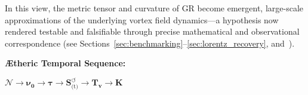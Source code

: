 In this view, the metric tensor and curvature of GR become emergent, large-scale approximations of the underlying vortex field dynamics—a hypothesis now rendered testable and falsifiable through precise mathematical and observational correspondence (see Sections~\ref{sec:benchmarking}–\ref{sec:lorentz_recovery}, and~\cite{VAM-8}).

\vspace{0.8em}

\noindent\textbf{Ætheric Temporal Sequence:}
\begin{center}
\(\boldsymbol{\mathcal{N}} \to \boldsymbol{\nu_0} \to \boldsymbol{\tau} \to \boldsymbol{S}^{\boldsymbol{\circlearrowleft}}_\text{(t)} \to \boldsymbol{T_v} \to \mathbb{\boldsymbol{K}}\)
\end{center}